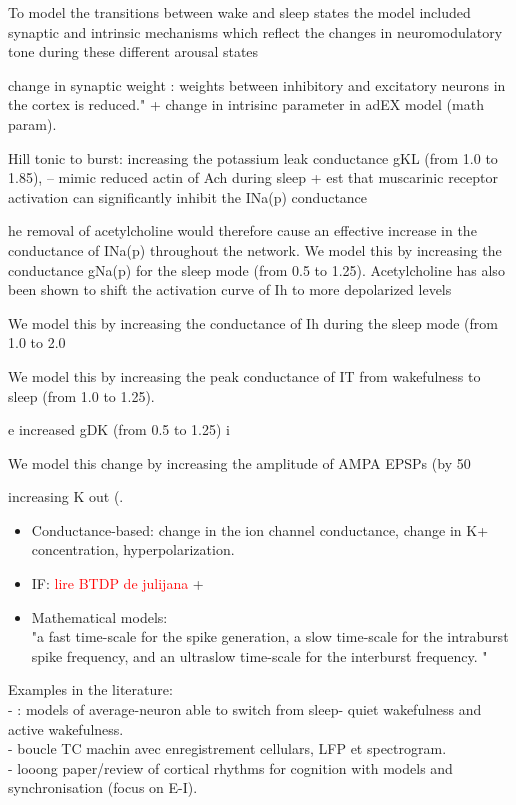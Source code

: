 To model the transitions between wake and sleep states the model included synaptic and intrinsic mechanisms which reflect the changes in neuromodulatory tone during these different arousal states \citep{gonzalez_can_2020}


change in synaptic weight : \citep{capone_sleep-like_2019} weights between inhibitory and excitatory neurons in the cortex is reduced." + change in intrisinc parameter in adEX model (math param).

Hill tonic to burst: increasing the potassium leak conductance gKL (from 1.0 to 1.85), -- mimic reduced actin of Ach during sleep + est that muscarinic receptor activation can significantly inhibit the INa(p) conductance

he removal of acetylcholine would therefore cause an effective increase in the conductance of INa(p) throughout the network. We model this by increasing the conductance gNa(p) for the sleep mode (from 0.5 to 1.25). Acetylcholine has also been shown to shift the activation curve of Ih to more depolarized levels

We model this by increasing the conductance of Ih during the sleep mode (from 1.0 to 2.0

We model this by increasing the peak conductance of IT from wakefulness to sleep (from 1.0 to 1.25).

e increased gDK (from 0.5 to 1.25) i

We model this change by increasing the amplitude of AMPA EPSPs (by 50%

increasing K out (\citep{bacak_modeling_2016}. 


\begin{itemize}
    \item Conductance-based: change in the ion channel conductance, change in K+ concentration, hyperpolarization.
    \item IF: \textcolor{red}{lire BTDP de julijana} + \citep{van_pottelbergh_robust_2018}
    \item Mathematical models: \\
    "a fast time-scale for the spike generation, a slow time-scale for the intraburst spike frequency, and an ultraslow time-scale for the interburst frequency. "\citep{franci_modeling_2014}
\end{itemize}

\color{gray}


Examples in the literature: \\
- \citep{rasmussen_chaotic_2017}: models of average-neuron able to switch from sleep- quiet wakefulness and active wakefulness. \\
- \citep{esser_breakdown_2009, krishnan_cellular_2016} boucle TC machin avec enregistrement cellulars, LFP et spectrogram. \\
- \citep{wang_neurophysiological_2010} looong paper/review of cortical rhythms for cognition with models and synchronisation (focus on E-I).

